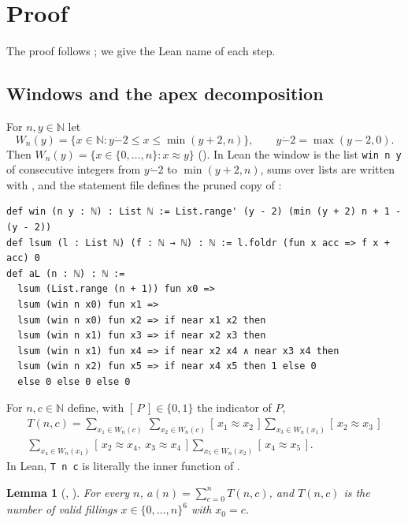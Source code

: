 \documentclass[11pt]{amsart}
\theoremstyle{plain}
\newtheorem{lemma}[theorem]{Lemma}
\theoremstyle{definition}
\newcommand{\N}{\mathbb{N}}
\newcommand{\nr}{\approx}
\newcommand{\monus}{\mathbin{\dot{-}}}
\newcommand{\ind}[1]{[\,#1\,]}
\begin{document}
\section{Proof}\label{sec:proof}

The proof follows ; we give the Lean name of each step.

\subsection{Windows and the apex decomposition}
For $n,y\in\N$ let
\[
  W_n(y)=\{x\in\N : y\monus2\le x\le\min(y+2,n)\},\qquad y\monus 2=\max(y-2,0).
\]
Then $W_n(y)=\{x\in\{0,\dots,n\}: x\nr y\}$ (). In Lean the window is the list \texttt{win n y} of consecutive integers from $y\monus 2$ to $\min(y+2,n)$, sums over lists are written with , and the statement file defines the pruned copy  of :
\begin{lstlisting}
def win (n y : ℕ) : List ℕ := List.range' (y - 2) (min (y + 2) n + 1 - (y - 2))
def lsum (l : List ℕ) (f : ℕ → ℕ) : ℕ := l.foldr (fun x acc => f x + acc) 0
def aL (n : ℕ) : ℕ :=
  lsum (List.range (n + 1)) fun x0 =>
  lsum (win n x0) fun x1 =>
  lsum (win n x0) fun x2 => if near x1 x2 then
  lsum (win n x1) fun x3 => if near x2 x3 then
  lsum (win n x1) fun x4 => if near x2 x4 ∧ near x3 x4 then
  lsum (win n x2) fun x5 => if near x4 x5 then 1 else 0
  else 0 else 0 else 0
\end{lstlisting}
For $n,c\in\N$ define, with $\ind{P}\in\{0,1\}$ the indicator of $P$,
\begin{multline}\label{eq:T}
  T(n,c)=\sum_{x_1\in W_n(c)}\ \sum_{x_2\in W_n(c)}\ind{x_1\nr x_2}\sum_{x_3\in W_n(x_1)}\ind{x_2\nr x_3}\\
  \sum_{x_4\in W_n(x_1)}\ind{x_2\nr x_4,\ x_3\nr x_4}\sum_{x_5\in W_n(x_2)}\ind{x_4\nr x_5}.
\end{multline}
In Lean, \texttt{T n c} is literally the inner function of .

\begin{lemma}[, ]\label{lem:sum}
For every $n$, $a(n)=\sum_{c=0}^{n}T(n,c)$, and $T(n,c)$ is the number of valid fillings $x\in\{0,\dots,n\}^6$ with $x_0=c$.
\end{lemma}
\end{document}
